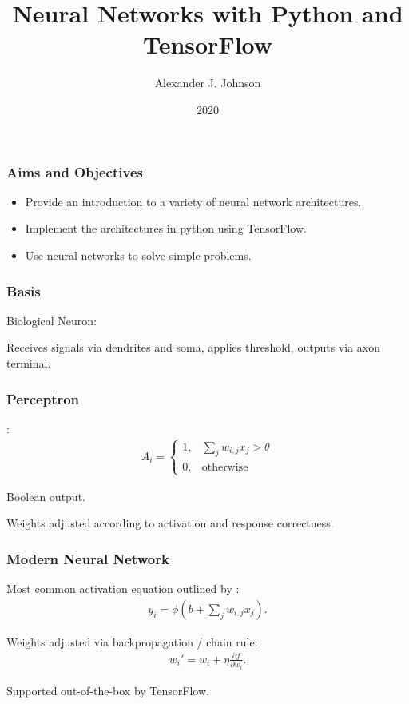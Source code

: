 \documentclass{beamer}
\title{Neural Networks with Python and TensorFlow}
\author{Alexander J. Johnson}
\institute{Manchester Metropolitan University}
\date{2020}
\begin{document}
\frame{\titlepage}

\begin{frame}
    \frametitle{Aims and Objectives}

    \begin{itemize}
        \item Provide an introduction to a variety of neural network
            architectures.
        \item Implement the architectures in python using TensorFlow.
        \item Use neural networks to solve simple problems.
    \end{itemize}
\end{frame}

\begin{frame}
    \frametitle{Basis}

    Biological Neuron:
    \begin{center}
        
    \end{center}
    Receives signals via dendrites and soma,
    applies threshold,
    outputs via axon terminal.
\end{frame}

\begin{frame}
    \frametitle{Perceptron}

    \cite{Rosenblatt:1958:Perceptron}:
    \begin{align*}
        A_i = \begin{cases}
            1, & \sum_j w_{i,j}x_j > \theta\\
            0, & \text{otherwise}
        \end{cases}
    \end{align*}

    Boolean output.

    Weights adjusted according to activation and response correctness.
\end{frame}

\begin{frame}
    \frametitle{Modern Neural Network}

    Most common activation equation outlined by \cite{McClelland:1986:Parallel}:
    \begin{align*}
        y_i = \phi \left(b + \sum_j w_{i,j}x_j\right).
    \end{align*}

    Weights adjusted via backpropagation / chain rule:
    \begin{align*}
        w_i' = w_i + \eta\frac{\partial f}{\partial w_i}.
    \end{align*}

    Supported out-of-the-box by TensorFlow.
\end{frame}
\end{document}
